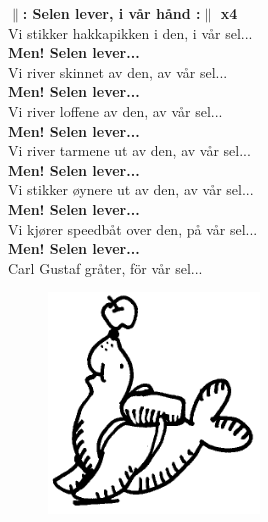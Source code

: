 \documentclass[a6paper, 10pt, twoside]{article}
\begin{document}
\begin{center}
\end{center}
\begin{lyrics}
\textbf{$\|$: Selen lever, i vår hånd :$\|$ x4}
\vspace{5pt}\\
Vi stikker hakkapikken i den, i vår sel...
\vspace{5pt}\\
\textbf{Men! Selen lever...}
\vspace{5pt}\\
Vi river skinnet av den, av vår sel...
\vspace{5pt}\\
\textbf{Men! Selen lever...}
\vspace{5pt}\\
Vi river loffene av den, av vår sel...
\vspace{5pt}\\
\textbf{Men! Selen lever...}
\vspace{5pt}\\
Vi river tarmene ut av den, av vår sel...
\vspace{5pt}\\
\textbf{Men! Selen lever...}
\vspace{5pt}\\
Vi stikker øynere ut av den, av vår sel...
\vspace{5pt}\\
\textbf{Men! Selen lever...}
\vspace{5pt}\\
Vi kjører speedbåt over den, på vår sel...
\vspace{5pt}\\
\textbf{Men! Selen lever...}
\vspace{5pt}\\
Carl Gustaf gråter, för vår sel... 
\end{lyrics}
\begin{figure}[!h]
\hfill 
\includegraphics[width=0.5\textwidth]{seal.png}
\end{figure}
\end{document}
